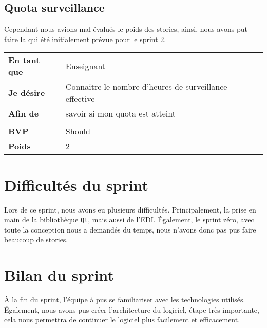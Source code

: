 \subsection{Quota surveillance} \label{usQuotaSurveillance}
Cependant nous avions mal évalués le poids des stories, ainsi, nous avons put faire la 
 qui été initialement prévue pour le sprint 2. 

\begin{tabular}{ll}
	\textbf{En tant que}	&	Enseignant \\
	\textbf{Je désire}&	Connaitre le nombre d'heures de surveillance effective\\
	\textbf{Afin de}	&	savoir si mon quota est atteint\\
	&\\
	\textbf{BVP} & Should\\
	\textbf{Poids} & 2\\
\end{tabular}

\section{Difficultés du sprint}
Lors de ce sprint, nous avons eu plusieurs difficultés. Principalement, la prise en main de la bibliothèque
\texttt{Qt}, mais aussi de l'EDI.
Également, le sprint zéro, avec toute la conception nous a demandés du temps, nous n'avons donc pas pus
faire beaucoup de stories. 

\section{Bilan du sprint}
À la fin du sprint, l'équipe à pus se familiariser avec les technologies utilisés. Également, nous avons
pus créer l'architecture du logiciel, étape très importante, cela nous permettra de continuer le logiciel
plus facilement et efficacement.


